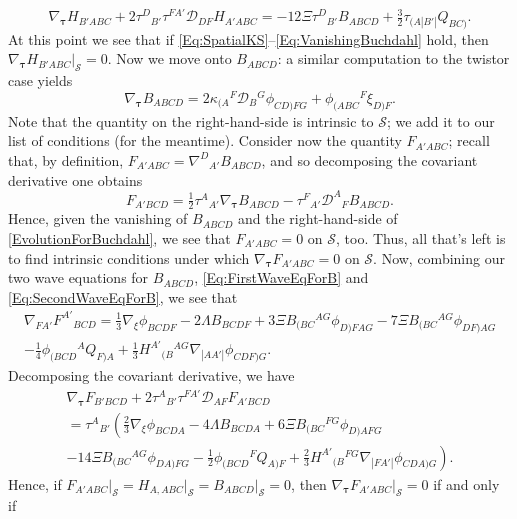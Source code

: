 \documentclass[10pt,a4paper]{article}
\theoremstyle{plain}
\begin{document}
\[ \nabla_{\bm\tau} H_{B'ABC} + 2 \tau^{D}{}_{B'} \tau^{FA'} \mathcal{D}_{DF}H_{A'ABC} = -12 \Xi \tau^{D}{}_{B'}B_{ABCD} + \tfrac{3}{2} \tau_{(A|B'|}Q_{BC)}.\]
At this point we see that if \eqref{Eq:SpatialKS}--\eqref{Eq:VanishingBuchdahl} hold, then $\nabla_{\bm\tau} H_{B'ABC}\big\vert_{\mathcal{S}}=0$. Now we move onto $B_{ABCD}$: a similar computation to the twistor case yields
\begin{equation}
    \nabla_{\bm\tau} B_{ABCD} = 2 \kappa_{(A}{}^{F}\mathcal{D}_{B}{}^{G}\phi_{CD)FG} + \phi_{(ABC}{}^{F}\xi_{D)F}.\label{EvolutionForBuchdahl}
\end{equation}
Note that the quantity on the right-hand-side is intrinsic to $\mathcal{S}$; we add it to our list of conditions (for the meantime). Consider now the quantity $F_{A'ABC}$; recall that, by definition, $F_{A'ABC}=\nabla^D{}_{A'}B_{ABCD}$, and so decomposing the covariant derivative one obtains
\[F_{A'BCD} = \tfrac{1}{2} \tau^{A}{}_{A'} \nabla_{\bm\tau} B_{ABCD}  -  \tau^{F}{}_{A'} \mathcal{D}^{A}{}_{F}B_{ABCD}.\]
Hence, given the vanishing of $B_{ABCD}$ and the right-hand-side of \eqref{EvolutionForBuchdahl}, we see that $F_{A'ABC}=0$ on $\mathcal{S}$, too. Thus, all that's left is to find intrinsic conditions under which $\nabla_{\bm\tau}F_{A'ABC}=0$ on $\mathcal{S}$. Now, combining our two wave equations for $B_{ABCD}$, \eqref{Eq:FirstWaveEqForB} and \eqref{Eq:SecondWaveEqForB}, we see that 
\begin{multline}
     \nabla_{FA'}F^{A'}{}_{BCD} = \tfrac{1}{3} \nabla_{\xi}{}\phi_{BCDF} - 2 \Lambda B_{BCDF} + 3\Xi B_{(BC}{}^{AG}  \phi_{D)FAG}  - 7 \Xi B_{(BC}{}^{AG}\phi_{DF)AG} \\-  \tfrac{1}{4} \phi_{(BCD}{}^{A}Q_{F)A} + \tfrac{1}{3} H^{A'}{}_{(B}{}^{AG}\nabla_{|AA'|}\phi_{CDF)G}\label{CurlOfFInTermsOfCollineation}. 
\end{multline}
Decomposing the covariant derivative, we have 
\begin{multline}
\nabla_{\bm\tau} F_{B'BCD} + 2 \tau^{A}{}_{B'} \tau^{FA'} \mathcal{D}_{AF}F_{A'BCD} \\
= \tau^{A}{}_{B'}\left(\tfrac{2}{3} \nabla_{\xi}{}\phi_{BCDA}  - 4 \Lambda  B_{BCDA} + 6 \Xi  B_{(BC}{}^{FG}  \phi_{D)AFG}  \right. \\ \left.  - 14 \Xi  B_{(BC}{}^{AG}\phi_{DA)FG}  -  \tfrac{1}{2}  \phi_{(BCD}{}^{F}Q_{A)F}   + \tfrac{2}{3}  H^{A'}{}_{(B}{}^{FG}\nabla_{|FA'|}\phi_{CDA)G}\right).
\end{multline}
Hence, if $F_{A'ABC}\big\vert_{\mathcal{S}}=H_{A,ABC}\big\vert_{\mathcal{S}}=B_{ABCD}\big\vert_{\mathcal{S}}=0$, then $\nabla_{\bm\tau}F_{A'ABC}\big\vert_{\mathcal{S}}=0$ if and only if  
\end{document}
